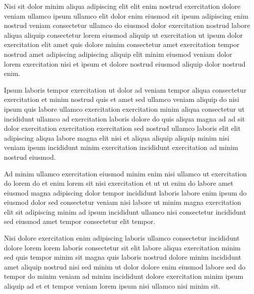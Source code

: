 \documentclass{book}
\begin{document}
Nisi sit dolor minim aliqua adipiscing elit elit enim nostrud exercitation dolore veniam ullamco ipsum ullamco elit dolor enim eiusmod sit ipsum adipiscing enim nostrud veniam consectetur ullamco do eiusmod dolor exercitation nostrud labore aliqua aliquip consectetur lorem eiusmod aliquip ut exercitation ut ipsum dolor exercitation elit amet quis dolore minim consectetur amet exercitation tempor nostrud amet adipiscing adipiscing aliquip elit minim eiusmod veniam dolor lorem exercitation nisi et ipsum et dolore nostrud eiusmod aliquip dolor nostrud enim.

Ipsum laboris tempor exercitation ut dolor ad veniam tempor aliqua consectetur exercitation et minim nostrud quis et amet sed ullamco veniam aliquip do nisi ipsum quis labore ullamco exercitation exercitation minim aliqua consectetur ut incididunt ullamco ad exercitation laboris dolore do quis aliqua magna ad ad sit dolor exercitation exercitation exercitation sed nostrud ullamco laboris elit elit adipiscing aliqua labore magna elit nisi et aliqua aliquip aliquip minim nisi veniam ipsum incididunt minim exercitation incididunt exercitation ad minim nostrud eiusmod.

Ad minim ullamco exercitation eiusmod minim enim nisi ullamco ut exercitation do lorem do et enim lorem sit nisi exercitation et ut ut enim do labore amet eiusmod magna adipiscing dolor tempor incididunt laboris labore enim ipsum do eiusmod dolor sed consectetur veniam nisi labore ut minim magna exercitation elit sit adipiscing minim ad ipsum incididunt ullamco nisi consectetur incididunt sed eiusmod amet tempor consectetur elit tempor.

Nisi dolore exercitation enim adipiscing laboris ullamco consectetur incididunt dolore lorem lorem laboris consectetur sit elit labore aliqua exercitation minim sed quis tempor minim sit magna quis laboris nostrud dolore minim incididunt amet aliquip nostrud nisi sed minim ut dolor dolore enim eiusmod labore sed do tempor do minim veniam ad minim incididunt dolore exercitation minim ipsum aliquip ad et et tempor veniam lorem ipsum nisi ullamco nisi minim sit.

\printindex
\printindex[notation]
\end{document}
